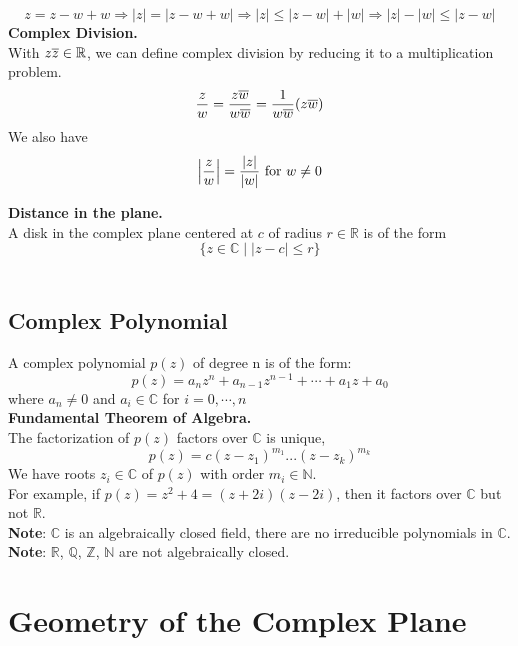 \documentclass[11pt]{article}
\DeclarePairedDelimiter\abs{\lvert}{\rvert}
\begin{document}
$$z = z - w + w \Rightarrow |z| = |z - w + w| \Rightarrow |z| \leqslant |z - w| + |w| \Rightarrow |z| - |w| \leqslant |z - w|$$
\newline
\textbf{Complex Division.} \\
With $z\overline{z} \in \mathbb{R}$, we can define complex division by reducing it to a multiplication problem. 
$$\frac{z}{w} = \frac{z\overline{w}}{w\overline{w}} = \frac{1}{w\overline{w}}(z\overline{w})$$ 
We also have 
\begin{equation*} 
\abs[\Big]{\frac{z}{w}} = \frac{|z|}{|w|} \mbox{ for } w \neq 0 
\end{equation*}

\textbf{Distance in the plane.} \\
A disk in the complex plane centered at $c$ of radius $r \in \mathbb{R}$ is of the form 
$$\{z \in \mathbb{C} \mid |z - c| \leqslant r\}$$
\\
\subsection{Complex Polynomial}
A complex polynomial $p(z)$ of degree n is of the form: 
$$p(z) = a_nz^n + a_{n - 1}z^{n - 1} + \cdots + a_1z + a_0$$
where $a_n \neq 0$ and $a_i \in \mathbb{C}$ for $ i = 0, \cdots , n$ \\
\newline
\textbf{Fundamental Theorem of Algebra.} \\

The factorization of $p(z)$ factors over $\mathbb{C}$ is unique, 
$$p(z) = c(z - z_1)^{m_1}...(z - z_k)^{m_k}$$
We have roots $z_i \in \mathbb{C}$ of $p(z)$ with order $m_i \in \mathbb{N}$. \\
For example, if $p(z) = z^2 + 4 = (z + 2i)(z - 2i)$, then it factors over $\mathbb{C}$ but not $\mathbb{R}$. \\
\textbf{Note}: 
$\mathbb{C}$ is an algebraically closed field, there are no irreducible polynomials in $\mathbb{C}$. \\
\textbf{Note}: 
$\mathbb{R}$,  $\mathbb{Q}$, $\mathbb{Z}$, $\mathbb{N}$ are not algebraically closed. \\

\newpage
\section{Geometry of the Complex Plane}
\end{document}
